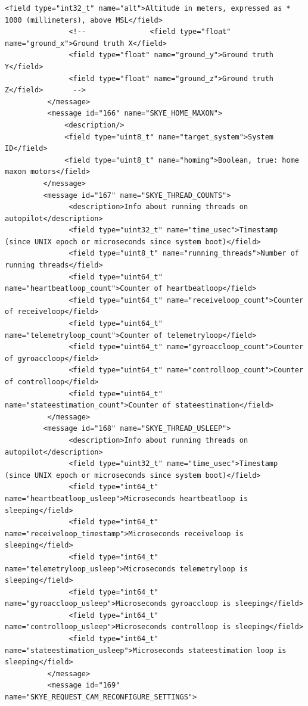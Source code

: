 \begin{lstlisting}[captionpos=b, caption="Definition of \textsc{Skye} specific Mavlink messages", label=app_xml]
               <field type="int32_t" name="alt">Altitude in meters, expressed as * 1000 (millimeters), above MSL</field>
               <!--               <field type="float" name="ground_x">Ground truth X</field>			
               <field type="float" name="ground_y">Ground truth Y</field>
               <field type="float" name="ground_z">Ground truth Z</field>		-->
          </message>
          <message id="166" name="SKYE_HOME_MAXON">
              <description/>
              <field type="uint8_t" name="target_system">System ID</field>
              <field type="uint8_t" name="homing">Boolean, true: home maxon motors</field>
         </message>
         <message id="167" name="SKYE_THREAD_COUNTS">
               <description>Info about running threads on autopilot</description>
               <field type="uint32_t" name="time_usec">Timestamp (since UNIX epoch or microseconds since system boot)</field>
               <field type="uint8_t" name="running_threads">Number of running threads</field>
               <field type="uint64_t" name="heartbeatloop_count">Counter of heartbeatloop</field>
               <field type="uint64_t" name="receiveloop_count">Counter of receiveloop</field>
               <field type="uint64_t" name="telemetryloop_count">Counter of telemetryloop</field>
               <field type="uint64_t" name="gyroaccloop_count">Counter of gyroaccloop</field>
               <field type="uint64_t" name="controlloop_count">Counter of controlloop</field>
               <field type="uint64_t" name="stateestimation_count">Counter of stateestimation</field>
          </message>
         <message id="168" name="SKYE_THREAD_USLEEP">
               <description>Info about running threads on autopilot</description>
               <field type="uint32_t" name="time_usec">Timestamp (since UNIX epoch or microseconds since system boot)</field>
               <field type="int64_t" name="heartbeatloop_usleep">Microseconds heartbeatloop is sleeping</field>
               <field type="int64_t" name="receiveloop_timestamp">Microseconds receiveloop is sleeping</field>
               <field type="int64_t" name="telemetryloop_usleep">Microseconds telemetryloop is sleeping</field>
               <field type="int64_t" name="gyroaccloop_usleep">Microseconds gyroaccloop is sleeping</field>
               <field type="int64_t" name="controlloop_usleep">Microseconds controlloop is sleeping</field>
               <field type="int64_t" name="stateestimation_usleep">Microseconds stateestimation loop is sleeping</field>
          </message>
          <message id="169" name="SKYE_REQUEST_CAM_RECONFIGURE_SETTINGS">

\end{lstlisting}
